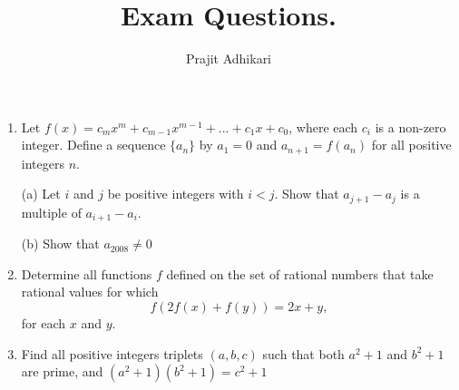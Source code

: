 \documentclass{article}
\begin{document}
\title{Exam Questions.}
\author{Prajit Adhikari}
\maketitle

\begin{enumerate}
    \item Let $ f(x) = c_m x^m + c_{m-1} x^{m-1} +...+ c_1 x + c_0$, where each $ c_i$ is a non-zero integer. Define a sequence $ \{ a_n \}$ by $ a_1 = 0$ and $ a_{n+1} = f(a_n)$ for all positive integers $ n$.

(a) Let $ i$ and $ j$ be positive integers with $ i<j$. Show that $ a_{j+1} - a_j$ is a multiple of $ a_{i+1} - a_i$.

(b) Show that $ a_{2008} \neq 0$

\item Determine all functions $ f$ defined on the set of rational numbers that take rational values for which
\[ f(2f(x) + f(y)) = 2x + y,\]
for each $ x$ and $ y$.
\item Find all positive integers triplets $(a,b,c)$ such that both $a^2+1$ and $b^2+1$ are prime, and $(a^2+1)(b^2+1)=c^2+1$
    
    
    
    
    
    
    
\end{enumerate}
\end{document}

